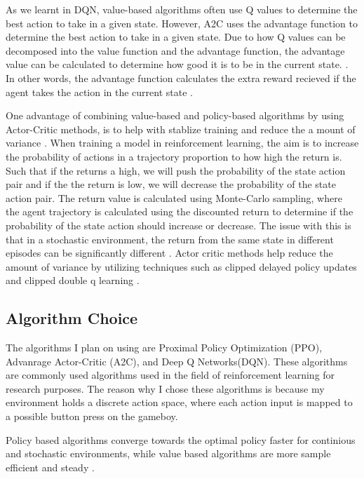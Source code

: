 As we learnt in DQN, value-based algorithms often use Q values to determine the best action to take in a given state. However, A2C uses the advantage function to determine the best action to take in a given state. Due to how Q values can be decomposed into the value function and the advantage function, the advantage value can be calculated to determine how good it is to be in the current state. \cite{SergiosKaragiannakos2018}. In other words, the advantage function calculates the extra reward recieved if the agent takes the action in the current state \cite{ThomasSimonini2022}.

One advantage of combining value-based and policy-based algorithms by using Actor-Critic methods, is to help with stablize training and reduce the a mount of variance \cite{SergiosKaragiannakos2018}. When training a model in reinforcement learning, the aim is to increase the probability of actions in a trajectory proportion to how high the return is. Such that if the returns a high, we will push the probability of the state action pair and if the the return is low, we will decrease the probability of the state action pair. The return value is calculated using Monte-Carlo sampling, where the agent trajectory is calculated using the discounted return to determine if the probability of the state action should increase or decrease. The issue with this is that in a stochastic environment, the return from the same state in different episodes can be significantly different \cite{ThomasSimonini2022}. Actor critic methods help reduce the amount of variance by utilizing techniques such as clipped delayed policy updates and clipped double q learning \cite{padhye2023deep}.

\subsection{Algorithm Choice}

The algorithms I plan on using are Proximal Policy Optimization (PPO), Advanrage Actor-Critic (A2C), and Deep Q Networks(DQN). These algorithms are commonly used algorithms used in the field of reinforcement learning for research purposes. The reason why I chose these algorithms is because my environment holds a discrete action space, where each action input is mapped to a possible button press on the gameboy.

Policy based algorithms converge towards the optimal policy faster for continious and stochastic environments, while value based algorithms are more sample efficient and steady \cite{SergiosKaragiannakos2018}.